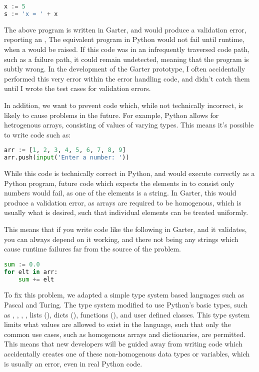 \begin{lstlisting}[language=Python]
x := 5
s := 'x = ' + x
\end{lstlisting}

The above program is written in Garter, and would produce a validation error,
reporting an ,  The equivalent program in Python would not fail until
runtime, when a  would be raised. If this code was in an
infrequently traversed code path, such as a failure path, it could remain
undetected, meaning that the program is subtly wrong. In the development of the
Garter prototype, I often accidentally performed this very error within the
error handling code, and didn't catch them until I wrote the test cases for
validation errors.

In addition, we want to prevent code which, while not technically incorrect,
is likely to cause problems in the future. For example, Python allows for
hetrogenous arrays, consisting of values of varying types. This means it's
possible to write code such as:

\begin{lstlisting}[language=Python]
arr := [1, 2, 3, 4, 5, 6, 7, 8, 9]
arr.push(input('Enter a number: '))
\end{lstlisting}

While this code is technically correct in Python, and would execute correctly as
a Python program, future code which expects the elements in  to
consist only numbers would fail, as one of the elements is a string. In Garter,
this would produce a  validation error, as arrays
are required to be homogenous, which is usually what is desired, such that
individual elements can be treated uniformly.

This means that if you write code like the following in Garter, and it
validates, you can always depend on it working, and there not being any strings
which cause runtime failures far from the source of the problem.

\begin{lstlisting}[language=Python]
sum := 0.0
for elt in arr:
    sum += elt
\end{lstlisting}

To fix this problem, we adapted a simple type system based languages such as
Pascal and Turing. The type system modified to use Python's basic types, such
as , , , , lists (\code{[T]}), dicts
(), functions (), and user defined classes.
This type system limits what values are allowed to exist in the language, such
that only the common use cases, such as homogenous arrays and dictionaries, are
permitted. This means that new developers will be guided away from writing code
which accidentally creates one of these non-homogenous data types or variables,
which is usually an error, even in real Python code.

